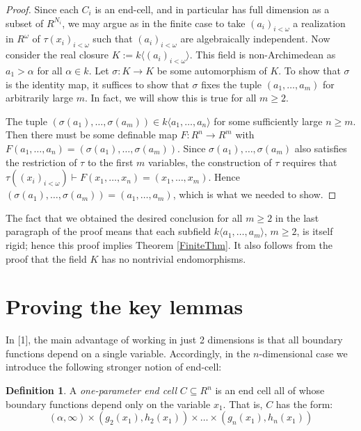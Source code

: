 \documentclass{article}
\theoremstyle{remark}
\theoremstyle{definition}
\newtheorem{definition}[theorem]{Definition}
\theoremstyle{definition}
\theoremstyle{definition}
\theoremstyle{definition}
\begin{document}
\begin{proof}
    Since each $C_i$ is an end-cell, and in particular has full dimension as a subset of $R^{N_i}$, we may argue as in the finite case to take $(a_i)_{i<\omega}$ a realization in $R^\omega$ of $\tau(x_i)_{i<\omega}$ such that $(a_i)_{i<\omega}$ are algebraically independent. Now consider the real closure $K:=k\langle (a_i)_{i<\omega}\rangle$. This field is non-Archimedean as $a_1>\alpha$ for all $\alpha\in k$. Let $\sigma:K\to K$ be some automorphism of $K$. To show that $\sigma$ is the identity map, it suffices to show that $\sigma$ fixes the tuple $(a_1,\dots,a_m)$ for arbitrarily large $m$. In fact, we will show this is true for all $m\geq 2$.

    The tuple $(\sigma(a_1),\dots,\sigma(a_m))\in k\langle a_1,\dots,a_n\rangle$ for some sufficiently large $n\geq m$. Then there must be some definable map $F:R^n\to R^m$ with $F(a_1,\dots,a_n)=(\sigma(a_1),\dots,\sigma(a_m))$. Since $\sigma(a_1),\dots,\sigma(a_m)$ also satisfies the restriction of $\tau$ to the first $m$ variables, the construction of $\tau$ requires that $\tau((x_i)_{i<\omega})\vdash F(x_1,\dots,x_n)=(x_1,\dots,x_m)$. Hence $(\sigma(a_1),\dots,\sigma(a_m))=(a_1,\dots,a_m)$, which is what we needed to show.
\end{proof}

The fact that we obtained the desired conclusion for all $m\geq 2$ in the last paragraph of the proof means that each subfield $k\langle a_1,\dots,a_m\rangle$, $m\geq 2$, is itself rigid; hence this proof implies Theorem \ref{FiniteThm}. It also follows from the proof that the field $K$ has no nontrivial endomorphisms.

\section{Proving the key lemmas}
In [1], the main advantage of working in just 2 dimensions is that all boundary functions depend on a single variable. Accordingly, in the $n$-dimensional case we introduce the following stronger notion of end-cell:

\begin{definition}
    A \textit{one-parameter end cell} $C\subseteq R^n$ is an end cell all of whose boundary functions depend only on the variable $x_1$. That is, $C$ has the form:
    \[(\alpha,\infty)\times(g_2(x_1),h_2(x_1))\times\dots\times(g_n(x_1),h_n(x_1))\]
\end{definition}
\end{document}
